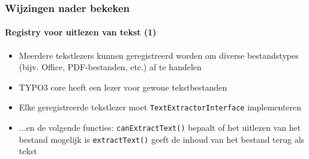 \begin{frame}[fragile]
	\frametitle{Wijzingen nader bekeken}
	\framesubtitle{Registry voor uitlezen van tekst (1)}

	\lstset{basicstyle=\tiny\ttfamily}

	\begin{itemize}

		\item Meerdere tekstlezers kunnen geregistreerd worden om diverse bestandstypes (bijv. Office, PDF-bestanden, etc.)
		af te handelen

		\item TYPO3 core heeft een lezer voor gewone tekstbestanden

		\item Elke geregistreerde tekstlezer moet \texttt{TextExtractorInterface} implementeren

		\item ...en de volgende functies:\newline
			\texttt{canExtractText()}\newline
			\small
				bepaalt of het uitlezen van het bestand mogelijk is
			\normalsize
			\newline
			\texttt{extractText()}\newline
			\small
				geeft de inhoud van het bestand terug als tekst
			\normalsize

	\end{itemize}

\end{frame}

